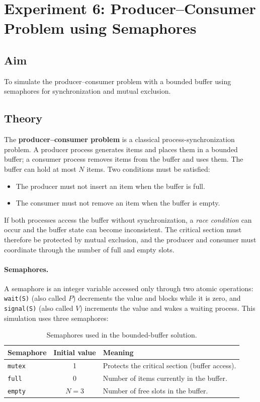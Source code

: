 \section{Experiment 6: Producer--Consumer Problem using Semaphores}
\label{exp:producerconsumer}

\subsection*{Aim}
To simulate the producer--consumer problem with a bounded buffer using semaphores for synchronization and mutual exclusion.

\subsection*{Theory}
The \textbf{producer--consumer problem} is a classical process-synchronization problem. A producer process generates items and places them in a bounded buffer; a consumer process removes items from the buffer and uses them. The buffer can hold at most $N$ items. Two conditions must be satisfied:
\begin{itemize}
    \item The producer must not insert an item when the buffer is full.
    \item The consumer must not remove an item when the buffer is empty.
\end{itemize}
If both processes access the buffer without synchronization, a \emph{race condition} can occur and the buffer state can become inconsistent. The critical section must therefore be protected by mutual exclusion, and the producer and consumer must coordinate through the number of full and empty slots.

\paragraph{Semaphores.}
A semaphore is an integer variable accessed only through two atomic operations: \texttt{wait(S)} (also called $P$) decrements the value and blocks while it is zero, and \texttt{signal(S)} (also called $V$) increments the value and wakes a waiting process. This simulation uses three semaphores:

\begin{table}[H]
\centering
\renewcommand{\arraystretch}{1.25}
\small
\begin{tabularx}{\textwidth}{|l|c|>{\raggedright\arraybackslash}X|}
\hline
\textbf{Semaphore} & \textbf{Initial value} & \textbf{Meaning} \\ \hline
\texttt{mutex} & 1 & Protects the critical section (buffer access). \\ \hline
\texttt{full} & 0 & Number of items currently in the buffer. \\ \hline
\texttt{empty} & $N = 3$ & Number of free slots in the buffer. \\ \hline
\end{tabularx}
\caption{Semaphores used in the bounded-buffer solution.}
\end{table}

